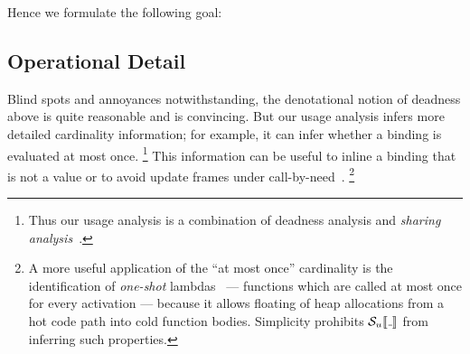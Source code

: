 
Hence we formulate the following goal:


\subsection{Operational Detail}

Blind spots and annoyances notwithstanding, the denotational notion of deadness
above is quite reasonable and  is convincing.
But our usage analysis infers more detailed cardinality information;
for example, it can infer whether a binding is evaluated at most once.%
\footnote{Thus our usage analysis is a combination of deadness analysis
and \emph{sharing analysis}~\citep{Gustavsson:98}.}
This information can be useful to inline a binding that is not a value or
to avoid update frames under call-by-need~\citep{Gustavsson:98,cardinality-ext}.%
\footnote{A more useful application of the ``at most once'' cardinality is the
identification of \emph{one-shot} lambdas~\citep{cardinality-ext} --- functions which are
called at most once for every activation --- because it allows floating of heap
allocations from a hot code path into cold function bodies.
Simplicity prohibits $\semusg{\wild}$ from inferring such properties.}

